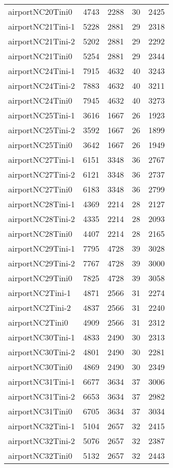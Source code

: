 \begin{longtable}{lrrrr}
airportNC20Tini0 & 4743 & 2288 & 30 & 2425 \\
airportNC21Tini-1 & 5228 & 2881 & 29 & 2318 \\
airportNC21Tini-2 & 5202 & 2881 & 29 & 2292 \\
airportNC21Tini0 & 5254 & 2881 & 29 & 2344 \\
airportNC24Tini-1 & 7915 & 4632 & 40 & 3243 \\
airportNC24Tini-2 & 7883 & 4632 & 40 & 3211 \\
airportNC24Tini0 & 7945 & 4632 & 40 & 3273 \\
airportNC25Tini-1 & 3616 & 1667 & 26 & 1923 \\
airportNC25Tini-2 & 3592 & 1667 & 26 & 1899 \\
airportNC25Tini0 & 3642 & 1667 & 26 & 1949 \\
airportNC27Tini-1 & 6151 & 3348 & 36 & 2767 \\
airportNC27Tini-2 & 6121 & 3348 & 36 & 2737 \\
airportNC27Tini0 & 6183 & 3348 & 36 & 2799 \\
airportNC28Tini-1 & 4369 & 2214 & 28 & 2127 \\
airportNC28Tini-2 & 4335 & 2214 & 28 & 2093 \\
airportNC28Tini0 & 4407 & 2214 & 28 & 2165 \\
airportNC29Tini-1 & 7795 & 4728 & 39 & 3028 \\
airportNC29Tini-2 & 7767 & 4728 & 39 & 3000 \\
airportNC29Tini0 & 7825 & 4728 & 39 & 3058 \\
airportNC2Tini-1 & 4871 & 2566 & 31 & 2274 \\
airportNC2Tini-2 & 4837 & 2566 & 31 & 2240 \\
airportNC2Tini0 & 4909 & 2566 & 31 & 2312 \\
airportNC30Tini-1 & 4833 & 2490 & 30 & 2313 \\
airportNC30Tini-2 & 4801 & 2490 & 30 & 2281 \\
airportNC30Tini0 & 4869 & 2490 & 30 & 2349 \\
airportNC31Tini-1 & 6677 & 3634 & 37 & 3006 \\
airportNC31Tini-2 & 6653 & 3634 & 37 & 2982 \\
airportNC31Tini0 & 6705 & 3634 & 37 & 3034 \\
airportNC32Tini-1 & 5104 & 2657 & 32 & 2415 \\
airportNC32Tini-2 & 5076 & 2657 & 32 & 2387 \\
airportNC32Tini0 & 5132 & 2657 & 32 & 2443 \\

\end{longtable}
